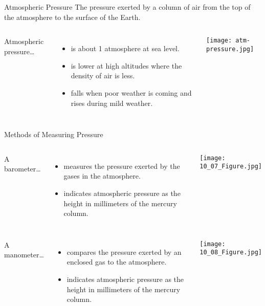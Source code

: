 \documentclass[handout]{beamer}
\begin{document}
\begin{frame}{Atmospheric Pressure}
		The pressure exerted by a column of air from the top of the atmosphere
		to the surface of the Earth.

		\bigskip
	
		\begin{columns}
		Atmospheric pressure\ldots
		\begin{itemize}
			\item is about 1 atmosphere at sea level.
			\item is lower at high altitudes where the density of air is
				less.
			\item falls when poor weather is coming and rises during
				mild weather.
		\end{itemize}
		\begin{center}
			\texttt{[image: atm-pressure.jpg]}
		\end{center}
	\end{columns}
\end{frame}

\begin{frame}[allowframebreaks]{Methods of Measuring Pressure}
	\begin{columns}
		\column{0.5\textwidth}
		A \alert{barometer}\ldots
		\begin{itemize}
			\item measures the pressure exerted by the gases in the
				atmosphere.
			\item indicates atmospheric pressure as the height in
				millimeters of the mercury column.
		\end{itemize}
		\column{0.5\textwidth}
		\begin{center}
			\texttt{[image: 10\_07\_Figure.jpg]}
		\end{center}
	\end{columns}

	\framebreak

	\begin{columns}
		\column{0.4\textwidth}
		A \alert{manometer}\ldots
		\begin{itemize}
			\item compares the pressure exerted by an enclosed gas to the
				atmosphere.
			\item indicates atmospheric pressure as the height in
				millimeters of the mercury column.
		\end{itemize}
		\column{0.6\textwidth}
		\begin{center}
			\texttt{[image: 10\_08\_Figure.jpg]}
		\end{center}
	\end{columns}
\end{frame}
\end{document}
